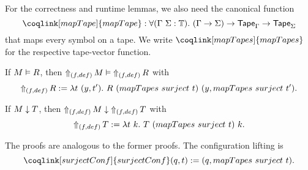 %
For the correctness and runtime lemmas, we also need the canonical function
\[
  \coqlink[mapTape]{mapTape}:\forall (\Tau~\Sigma:\Type).~(\Tau\to\Sigma)\to\Tape_\Tau\to\Tape_\Sigma
\]
that maps every symbol on a tape.  We write $\coqlink[mapTapes]{mapTapes}$ for the respective tape-vector function.
%

\begin{lemma}
  \label{lem:LiftAlphabet_Realise}
  If $M \Realise R$, then $\LiftAlphabet{M}{(f,def)} \Realise \LiftAlphabet{R}{(f,def)}$ with
  \[
    \LiftAlphabet{R}{(f,def)} := \lambda t~(y, t').~R~(mapTapes~surject~t)~(y, mapTapes~surject~t').
  \]
\end{lemma}

\begin{lemma}
  \label{lem:LiftAlphabet_TerminatesIn}
  If $M \TerminatesIn T$, then $\LiftAlphabet{M}{(f,def)} \TerminatesIn \LiftAlphabet{T}{(f,def)}$ with
  \[
    \LiftAlphabet{T}{(f,def)} := \lambda t~k.~T~(mapTapes~surject~t)~k.
  \]
\end{lemma}

The proofs are analogous to the former proofs.  The configuration lifting is
\[
  \coqlink[surjectConf]{surjectConf} (q,t) := (q, mapTapes~surject~t).
\]



